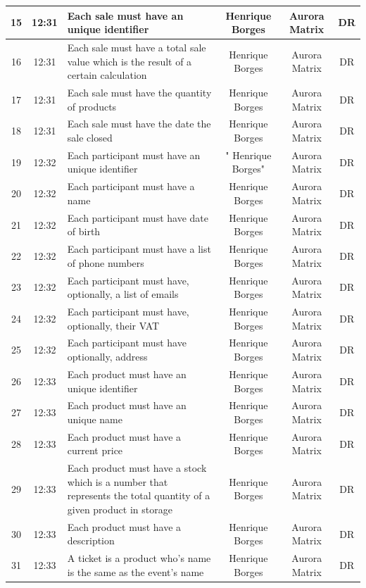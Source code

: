 \documentclass[a4paper,12pt]{scrreprt}
\begin{document}
\begin{table}[h]
{\begin{tabular}{ | c | c |p{15cm} | c | c | c |}
        15 & 12:31 & Each sale must have an unique identifier & Henrique Borges & Aurora Matrix & DR \\ \hline
        16 & 12:31 & Each sale must have a total sale value which is the result of a certain calculation & Henrique Borges & Aurora Matrix & DR \\ \hline
        17 & 12:31 & Each sale must have the quantity of products & Henrique Borges & Aurora Matrix & DR \\ \hline
        18 & 12:31 & Each sale must have the date the sale closed & Henrique Borges & Aurora Matrix & DR \\ \hline
        19 & 12:32 & Each participant must have an unique identifier & " Henrique Borges" & Aurora Matrix & DR \\ \hline
        20 & 12:32 & Each participant must have a name & Henrique Borges & Aurora Matrix & DR \\ \hline
        21 & 12:32 & Each participant must have date of birth & Henrique Borges & Aurora Matrix & DR \\ \hline
        22 & 12:32 & Each participant must have a list of phone numbers & Henrique Borges & Aurora Matrix & DR \\ \hline
        23 & 12:32 & Each participant must have, optionally, a list of emails & Henrique Borges & Aurora Matrix & DR \\ \hline
        24 & 12:32 & Each participant must have, optionally, their VAT & Henrique Borges & Aurora Matrix & DR \\ \hline
        25 & 12:32 & Each participant must have optionally, address & Henrique Borges & Aurora Matrix & DR \\ \hline
        26 & 12:33 & Each product must have an unique identifier & Henrique Borges & Aurora Matrix & DR \\ \hline
        27 & 12:33 & Each product must have an unique name & Henrique Borges & Aurora Matrix & DR \\ \hline
        28 & 12:33 & Each product must have a current price & Henrique Borges & Aurora Matrix & DR \\ \hline
        29 & 12:33 & Each product must have a stock which is a number that represents the total quantity of a given product in storage & Henrique Borges & Aurora Matrix & DR \\ \hline
        30 & 12:33 & Each product must have a description & Henrique Borges & Aurora Matrix & DR \\ \hline
        31 & 12:33 & A ticket is a product who's name is the same as the event's name & Henrique Borges & Aurora Matrix & DR \\ \hline

\end{tabular}}
\end{table}
\end{document}

